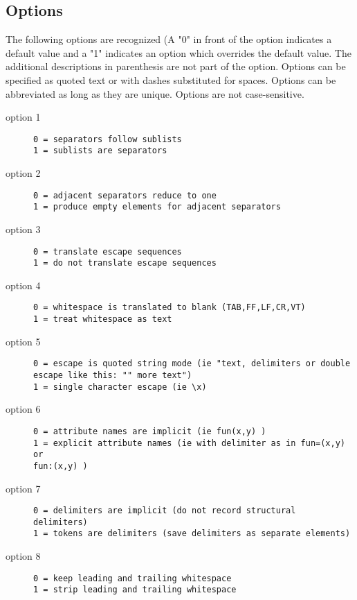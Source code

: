 \subsection{Options}
The following options are recognized (A "0" in front of the option indicates a default value and a "1" indicates an option which overrides the default value. The additional descriptions in parenthesis are not part of the option. Options can be specified as quoted text or with dashes substituted for spaces. Options can be abbreviated as long as they are unique. Options are not case-sensitive.
\begin{description}
\item[option 1]
\begin{verbatim}
0 = separators follow sublists
1 = sublists are separators
\end{verbatim}
\item[option 2]
\begin{verbatim}
0 = adjacent separators reduce to one
1 = produce empty elements for adjacent separators
\end{verbatim}
\item[option 3]
\begin{verbatim}
0 = translate escape sequences
1 = do not translate escape sequences
\end{verbatim}
\item[option 4]
\begin{verbatim}
0 = whitespace is translated to blank (TAB,FF,LF,CR,VT)
1 = treat whitespace as text
\end{verbatim}
\item[option 5]
\begin{verbatim}
0 = escape is quoted string mode (ie "text, delimiters or double escape like this: "" more text")
1 = single character escape (ie \x)
\end{verbatim}
\item[option 6]
\begin{verbatim}
0 = attribute names are implicit (ie fun(x,y) )
1 = explicit attribute names (ie with delimiter as in fun=(x,y) or
fun:(x,y) )
\end{verbatim}
\item[option 7]
\begin{verbatim}
0 = delimiters are implicit (do not record structural delimiters)
1 = tokens are delimiters (save delimiters as separate elements)
\end{verbatim}
\item[option 8]
\begin{verbatim}
0 = keep leading and trailing whitespace
1 = strip leading and trailing whitespace
\end{verbatim}
\end{description}